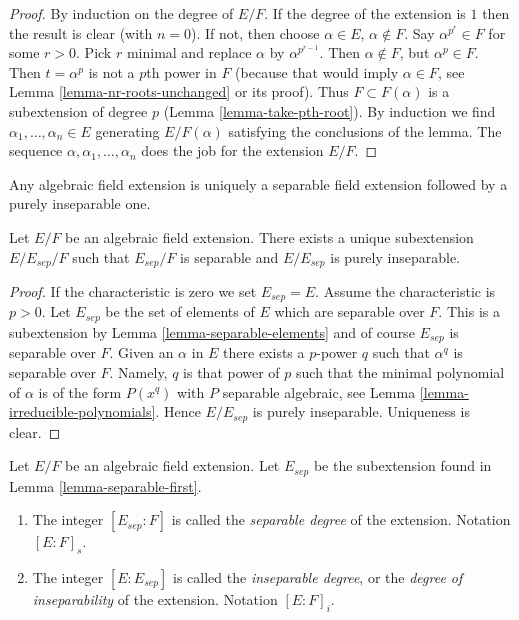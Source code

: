 \begin{proof}
By induction on the degree of $E/F$. If the degree of the extension is $1$
then the result is clear (with $n = 0$). If not, then choose
$\alpha \in E$, $\alpha \not \in F$. Say $\alpha^{p^r} \in F$ for some
$r > 0$. Pick $r$ minimal and replace $\alpha$ by $\alpha^{p^{r - 1}}$.
Then $\alpha \not \in F$, but $\alpha^p \in F$. Then $t = \alpha^p$ is not
a $p$th power in $F$ (because that would imply $\alpha \in F$, see
Lemma \ref{lemma-nr-roots-unchanged} or its proof).
Thus $F \subset F(\alpha)$ is a subextension of degree $p$
(Lemma \ref{lemma-take-pth-root}). By induction we find
$\alpha_1, \ldots, \alpha_n \in E$ generating $E/F(\alpha)$
satisfying the conclusions of the lemma.
The sequence $\alpha, \alpha_1, \ldots, \alpha_n$ does the job
for the extension $E/F$.
\end{proof}

\begin{lemma}
\label{lemma-separable-first}
\begin{slogan}
Any algebraic field extension is uniquely a separable field extension
followed by a purely inseparable one.
\end{slogan}
Let $E/F$ be an algebraic field extension. There exists a unique subextension
$E/E_{sep}/F$ such that $E_{sep}/F$ is separable and $E/E_{sep}$ is
purely inseparable.
\end{lemma}

\begin{proof}
If the characteristic is zero we set $E_{sep} = E$. Assume the characteristic
is $p > 0$. Let $E_{sep}$ be the set of elements of $E$ which are separable
over $F$. This is a subextension by Lemma \ref{lemma-separable-elements}
and of course $E_{sep}$ is separable over $F$. Given an $\alpha$ in $E$
there exists a $p$-power $q$ such that $\alpha^q$ is separable over $F$.
Namely, $q$ is that power of $p$ such that the minimal polynomial of
$\alpha$ is of the form $P(x^q)$ with $P$ separable algebraic, see
Lemma \ref{lemma-irreducible-polynomials}. Hence $E/E_{sep}$ is purely
inseparable. Uniqueness is clear.
\end{proof}

\begin{definition}
\label{definition-insep-degree}
Let $E/F$ be an algebraic field extension. Let $E_{sep}$ be the subextension
found in Lemma \ref{lemma-separable-first}.
\begin{enumerate}
\item The integer $[E_{sep} : F]$ is called the {\it separable
degree} of the extension. Notation $[E : F]_s$.
\item The integer $[E : E_{sep}]$ is called the {\it inseparable
degree}, or the {\it degree of inseparability} of the extension.
Notation $[E : F]_i$.
\end{enumerate}
\end{definition}

